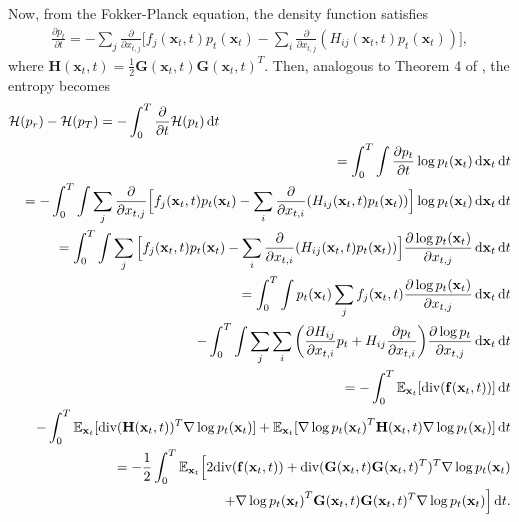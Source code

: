 \documentclass{article}
\theoremstyle{definition}
\theoremstyle{remark}
\newcommand*\diff{\mathop{}\!\mathrm{d}}
\begin{document}
	Now, from the Fokker-Planck equation, the density function satisfies
	\begin{align*}
	\frac{\partial p_{t}}{\partial t}=-\sum_{j}\frac{\partial}{\partial x_{t,j}}\Big[f_{j}(\mathbf{x}_{t},t)p_{t}(\mathbf{x}_{t})-\sum_{i}\frac{\partial}{\partial x_{t,j}}(H_{ij}(\mathbf{x}_{t},t)p_{t}(\mathbf{x}_{t}))\Big],
	\end{align*}
	where $\mathbf{H}(\mathbf{x}_{t},t)=\frac{1}{2}\mathbf{G}(\mathbf{x}_{t},t)\mathbf{G}(\mathbf{x}_{t},t)^{T}$. Then, analogous to Theorem 4 of \citet{song2021maximum}, the entropy becomes
	\begin{eqnarray*}
		\lefteqn{\mathcal{H}(p_{r})-\mathcal{H}(p_{T})=-\int_{0}^{T}\frac{\partial}{\partial t}\mathcal{H}(p_{t})\diff t}&\\
		&&=\int_{0}^{T}\int\frac{\partial p_{t}}{\partial t}\log{p_{t}(\mathbf{x}_{t})}\diff \mathbf{x}_{t}\diff t\\
		&&=-\int_{0}^{T}\int\sum_{j}\frac{\partial}{\partial x_{t,j}}\Big[f_{j}(\mathbf{x}_{t},t)p_{t}(\mathbf{x}_{t})-\sum_{i}\frac{\partial}{\partial x_{t,i}}(H_{ij}(\mathbf{x}_{t},t)p_{t}(\mathbf{x}_{t}))\Big]\log{p_{t}(\mathbf{x}_{t})}\diff\mathbf{x}_{t}\diff t\\
		&&=\int_{0}^{T}\int \sum_{j}\Big[f_{j}(\mathbf{x}_{t},t)p_{t}(\mathbf{x}_{t})-\sum_{i}\frac{\partial}{\partial x_{t,i}}(H_{ij}(\mathbf{x}_{t},t)p_{t}(\mathbf{x}_{t}))\Big]\frac{\partial \log{p_{t}(\mathbf{x}_{t})}}{\partial x_{t,j}}\diff\mathbf{x}_{t}\diff t\\
		&&=\int_{0}^{T}\int p_{t}(\mathbf{x}_{t})\sum_{j} f_{j}(\mathbf{x}_{t},t)\frac{\partial\log{p_{t}(\mathbf{x}_{t})}}{\partial x_{t,j}}\diff\mathbf{x}_{t}\diff t\\
		&&\quad-\int_{0}^{T}\int \sum_{j}\sum_{i}\bigg(\frac{\partial H_{ij}}{\partial x_{t,i}}p_{t}+H_{ij}\frac{\partial p_{t}}{\partial x_{t,i}}\bigg)\frac{\partial\log{p_{t}}}{\partial x_{t,j}}\diff\mathbf{x}_{t}\diff t\\
		&&=-\int_{0}^{T}\mathbb{E}_{\mathbf{x}_{t}}[\text{div}(\mathbf{f}(\mathbf{x}_{t},t))]\diff t\\
		&&\quad-\int_{0}^{T}\mathbb{E}_{\mathbf{x}_{t}}[\text{div}(\mathbf{H}(\mathbf{x}_{t},t))^{T}\nabla\log{p_{t}(\mathbf{x}_{t})}]+\mathbb{E}_{\mathbf{x}_{t}}[\nabla\log{p_{t}(\mathbf{x}_{t})}^{T}\mathbf{H}(\mathbf{x}_{t},t)\nabla\log{p_{t}(\mathbf{x}_{t})}]\diff t\\
		&&=-\frac{1}{2}\int_{0}^{T}\mathbb{E}_{\mathbf{x}_{t}}\Big[ 2\text{div}(\mathbf{f}(\mathbf{x}_{t},t))+\text{div}(\mathbf{G}(\mathbf{x}_{t},t)\mathbf{G}(\mathbf{x}_{t},t)^{T})^{T}\nabla\log{p_{t}(\mathbf{x}_{t})}\\
		&&\quad\quad\quad\quad\quad\quad\quad\quad+\nabla\log{p_{t}(\mathbf{x}_{t})}^{T}\mathbf{G}(\mathbf{x}_{t},t)\mathbf{G}(\mathbf{x}_{t},t)^{T}\nabla\log{p_{t}(\mathbf{x}_{t})} \Big]\diff t.
	\end{eqnarray*}
\end{document}
